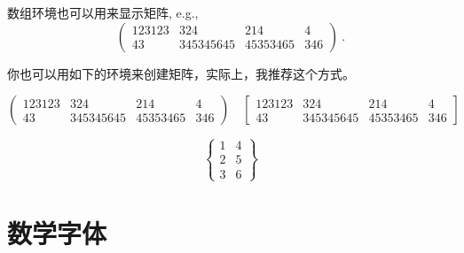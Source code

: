 数组环境也可以用来显示矩阵, e.g., 
\begin{equation}
	\left(
	\begin{array}{cccc}
	123123 & 324 & 214 & 4 \\
	43& 345345645 & 45353465 & 346
	\end{array}
	\right) \ .
\end{equation}

你也可以用如下的环境来创建矩阵，实际上，我推荐这个方式。

\begin{equation}
	\begin{pmatrix}
	123123 & 324 & 214 & 4 \\
	43& 345345645 & 45353465 & 346
	\end{pmatrix} 
	\quad
	\begin{bmatrix}
	123123 & 324 & 214 & 4 \\
	43& 345345645 & 45353465 & 346
	\end{bmatrix}
\end{equation}

\begin{equation}
    \begin{Bmatrix}
        1 & 4 \\
        2 & 5 \\
        3 & 6
    \end{Bmatrix}
\end{equation}

\section{数学字体}

